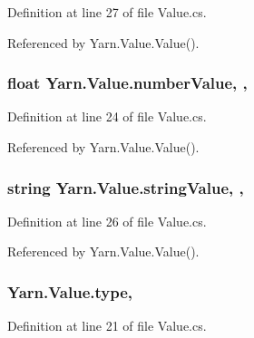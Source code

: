 Definition at line 27 of file Value.\-cs.



Referenced by Yarn.\-Value.\-Value().

\hypertarget{a00165_ae1892c1c7a8177537d1caa39a2e51da6}{
\subsubsection[{number\-Value}]{\setlength{\rightskip}{0pt plus 5cm}float Yarn.\-Value.\-number\-Value\hspace{0.3cm}{\ttfamily [get]}, {\ttfamily [set]}, {\ttfamily [package]}}}\label{a00165_ae1892c1c7a8177537d1caa39a2e51da6}


Definition at line 24 of file Value.\-cs.



Referenced by Yarn.\-Value.\-Value().

\hypertarget{a00165_add1b07146f1a9e4b655b33c93d07dff9}{
\subsubsection[{string\-Value}]{\setlength{\rightskip}{0pt plus 5cm}string Yarn.\-Value.\-string\-Value\hspace{0.3cm}{\ttfamily [get]}, {\ttfamily [set]}, {\ttfamily [package]}}}\label{a00165_add1b07146f1a9e4b655b33c93d07dff9}


Definition at line 26 of file Value.\-cs.



Referenced by Yarn.\-Value.\-Value().

\hypertarget{a00165_a6d5820fafa766911b9da84d1ed33e51a}{
\subsubsection[{type}]{ Yarn.\-Value.\-type\hspace{0.3cm}{\ttfamily [get]}, {\ttfamily [set]}}}\label{a00165_a6d5820fafa766911b9da84d1ed33e51a}


Definition at line 21 of file Value.\-cs.



